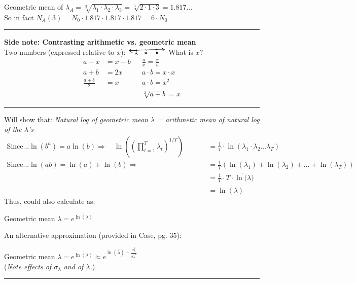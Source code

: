 \documentclass{article}
\begin{document}
\begin{center}
	Geometric mean of $\lambda_A = \sqrt[3]{\lambda_1 \cdot \lambda_2 \cdot \lambda_3} = \sqrt[3]{2 \cdot 1 \cdot 3} = 1.817...$\\
	So in fact $N_A(3) = N_0 \cdot 1.817 \cdot 1.817 \cdot 1.817 = 6 \cdot N_0$
\end{center}

\begin{center}\rule[0.1ex]{0.6\linewidth}{1pt}\end{center}
\textbf{Side note: Contrasting arithmetic vs. geometric mean}\\
Two numbers (expressed relative to $x$):
\includegraphics[width=2cm]{figs/ab_line}  What is $x$?
\begin{align*}
	a-x & = x-b & & \frac{a}{x} = \frac{x}{b}\\
	a+b&=2x & & a \cdot b = x \cdot x\\
	\frac{a+b}{2}&=x & & a \cdot b = x^2\\
	&&& \sqrt[2]{a+b} = x
\end{align*}
\begin{center}\rule[0.1ex]{0.6\linewidth}{1pt}\end{center}

Will show that: 	\emph{Natural log of geometric mean $\lambda$ = arithmetic mean of natural log of the $\lambda$'s}
\begin{align*}
	\text{Since...} \ln(b^a) = a\ln(b)  \Rightarrow \quad
	\ln \left( \left(\prod_{t=1}^T \lambda_t \right)^{1/T}\right) &= \frac{1}{T} \cdot \ln(\lambda_1 \cdot \lambda_2 \dots \lambda_T ) \\
	\text{Since...} \ln(ab) = \ln(a)+\ln(b)  \Rightarrow \quad \quad \quad \quad \quad \quad \quad \quad \quad
	&= \frac{1}{T} \left( \ln(\lambda_1) + \ln(\lambda_2) + \dots+ \ln(\lambda_T) \right) \\	
	&=\frac{1}{T} \cdot T \cdot \overline{\ln(\lambda}) \\
	&=\overline{\ln(\lambda)}
\end{align*}
Thus, could also calculate as:
\begin{center}
	Geometric mean $\lambda = e^{\overline{\ln(\lambda)}}$
\end{center}
An alternative approximation (provided in Case, pg. 35):
\begin{center}
	Geometric mean $\lambda = e^{\overline{\ln(\lambda)}} \approx e^{\ln(\bar{\lambda})-\frac{\sigma_\lambda^2}{2\bar{\lambda}^2}}$\\
	(\emph{Note effects of $\sigma_{\lambda}$ and of $\bar{\lambda}$.})
\end{center}
\rule[0.5ex]{\linewidth}{1pt}
\end{document}
